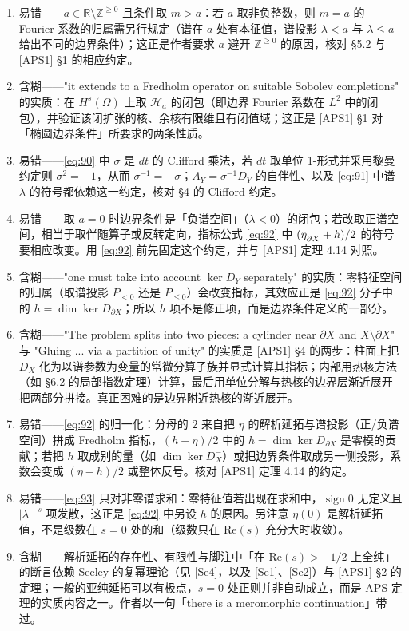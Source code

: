 \documentclass[11pt]{amsart}
\theoremstyle{definition}
\theoremstyle{remark}
\theoremstyle{plain}
\numberwithin{equation}{section}
\renewcommand{\:}{\colon}
\newcommand{\RR}{{\mathbb R}}
\newcommand{\ZZ}{{\mathbb Z}}
\newcommand{\inv}{^{-1}}
\DeclareRobustCommand{\mstrut}{^{\vphantom{1*\prime y\vee M}}}
\DeclareMathOperator{\sign}{sign}
\newcommand{\bX}{\partial X}
\newcommand{\et}[1]{\eta \mstrut _{#1}}
\newcommand{\sH}{\mathscr{H}}
\renewcommand{\Re}{\text{Re}}
\begin{document}
\begin{enumerate}[leftmargin=2.2em,itemsep=2pt,topsep=2pt]
  \item 易错——$a\in \RR\setminus \ZZ^{\ge0}$ 且条件取 $m>a$：若 $a$ 取非负整数，则 $m=a$ 的 Fourier 系数的归属需另行规定（谱在 $a$ 处有本征值，谱投影 $\lambda<a$ 与 $\lambda\le a$ 给出不同的边界条件）；这正是作者要求 $a$ 避开 $\ZZ^{\ge0}$ 的原因，核对 §5.2 与 [APS1] §1 的相应约定。
  \item 含糊——"it extends to a Fredholm operator on suitable Sobolev completions" 的实质：在 $H^s(\Omega)$ 上取 $\sH_a$ 的闭包（即边界 Fourier 系数在 $L^2$ 中的闭包），并验证该闭扩张的核、余核有限维且有闭值域；这正是 [APS1] §1 对「椭圆边界条件」所要求的两条性质。
  \item 易错——\eqref{eq:90} 中 $\sigma$ 是 $dt$ 的 Clifford 乘法，若 $dt$ 取单位 1-形式并采用黎曼约定则 $\sigma^2=-1$，从而 $\sigma\inv=-\sigma$；$A_Y=\sigma\inv D_Y$ 的自伴性、以及 \eqref{eq:91} 中谱 $\lambda$ 的符号都依赖这一约定，核对 §4 的 Clifford 约定。
  \item 易错——取 $a=0$ 时边界条件是「负谱空间」（$\lambda<0$）的闭包；若改取正谱空间，相当于取伴随算子或反转定向，指标公式 \eqref{eq:92} 中 $(\et{\bX}+h)/2$ 的符号要相应改变。用 \eqref{eq:92} 前先固定这个约定，并与 [APS1] 定理 4.14 对照。
  \item 含糊——"one must take into account $\ker D_Y$ separately" 的实质：零特征空间的归属（取谱投影 $P_{<0}$ 还是 $P_{\le0}$）会改变指标，其效应正是 \eqref{eq:92} 分子中的 $h=\dim\ker D_{\bX}$；所以 $h$ 项不是修正项，而是边界条件定义的一部分。
  \item 含糊——"The problem splits into two pieces: a cylinder near $\bX$ and $X\setminus\bX$" 与 "Gluing ... via a partition of unity" 的实质是 [APS1] §4 的两步：柱面上把 $D_X$ 化为以谱参数为变量的常微分算子族并显式计算其指标；内部用热核方法（如 §6.2 的局部指数定理）计算，最后用单位分解与热核的边界层渐近展开把两部分拼接。真正困难的是边界附近热核的渐近展开。
  \item 易错——\eqref{eq:92} 的归一化：分母的 $2$ 来自把 $\eta$ 的解析延拓与谱投影（正/负谱空间）拼成 Fredholm 指标，$(h+\eta)/2$ 中的 $h=\dim\ker D_{\bX}$ 是零模的贡献；若把 $h$ 取成别的量（如 $\dim\ker D_X^-$）或把边界条件取成另一侧投影，系数会变成 $(\eta-h)/2$ 或整体反号。核对 [APS1] 定理 4.14 的约定。
  \item 易错——\eqref{eq:93} 只对非零谱求和：零特征值若出现在求和中，$\sign 0$ 无定义且 $|\lambda|^{-s}$ 项发散，这正是 \eqref{eq:92} 中另设 $h$ 的原因。另注意 $\eta(0)$ 是解析延拓值，不是级数在 $s=0$ 处的和（级数只在 $\Re(s)$ 充分大时收敛）。
  \item 含糊——解析延拓的存在性、有限性与脚注中「在 $\Re(s)>-1/2$ 上全纯」的断言依赖 Seeley 的复幂理论（见 [Se4]，以及 [Se1]、[Se2]）与 [APS1] §2 的定理；一般的亚纯延拓可以有极点，$s=0$ 处正则并非自动成立，而是 APS 定理的实质内容之一。作者以一句「there is a meromorphic continuation」带过。

\end{enumerate}
\end{document}

